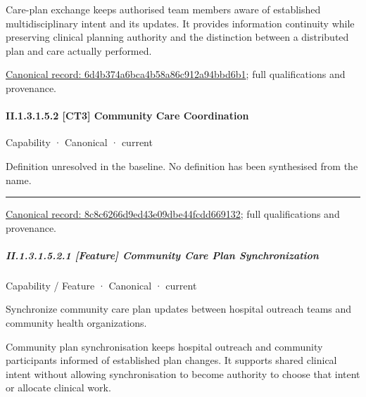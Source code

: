 Care-plan exchange keeps authorised team members aware of established multidisciplinary intent and its updates. It provides information continuity while preserving clinical planning authority and the distinction between a distributed plan and care actually performed.


{\footnotesize \href{../../../../../../../continuum/strategy/capability/feature/6d4b374a6bca4b58a86c912a94bbd6b1.md}{Canonical record: 6d4b374a6bca4b58a86c912a94bbd6b1}; full qualifications and provenance.}\par
\paragraph*{II.1.3.1.5.2 [CT3] Community Care Coordination}
\label{navigation:II.1.3.1.5.2}

\label{element:8c8c6266d9ed43e09dbe44fcdd669132}
{\small Capability · Canonical · current}\par

Definition unresolved in the baseline. No definition has been synthesised from the name.



\medskip\hrule\medskip

{\footnotesize \href{../../../../../../../continuum/strategy/capability/8c8c6266d9ed43e09dbe44fcdd669132.md}{Canonical record: 8c8c6266d9ed43e09dbe44fcdd669132}; full qualifications and provenance.}\par
\subparagraph*{II.1.3.1.5.2.1 [Feature] Community Care Plan Synchronization}
\label{navigation:II.1.3.1.5.2.1}

\label{element:30a0a2a6f1044d9ca9337b655f303e24}
{\small Capability / Feature · Canonical · current}\par

Synchronize community care plan updates between hospital outreach teams and community health organizations.



Community plan synchronisation keeps hospital outreach and community participants informed of established plan changes. It supports shared clinical intent without allowing synchronisation to become authority to choose that intent or allocate clinical work.


